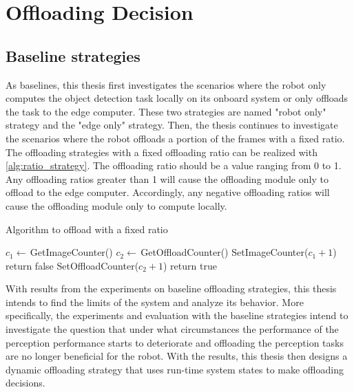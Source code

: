 \section{Offloading Decision}\label{sec:offloading_decision}

\subsection{Baseline strategies}

As baselines, this thesis first investigates the scenarios where the robot only computes the object detection task locally on its onboard system or only offloads the task to the edge computer. These two strategies are named "robot only" strategy and the "edge only" strategy. Then, the thesis continues to investigate the scenarios where the robot offloads a portion of the frames with a fixed ratio. The offloading strategies with a fixed offloading ratio can be realized with \cref{alg:ratio_strategy}. The offloading ratio should be a value ranging from 0 to 1. Any offloading ratios greater than 1 will cause the offloading module only to offload to the edge computer. Accordingly, any negative offloading ratios will cause the offloading module only to compute locally. 

\begin{algorithm}[htp]
\caption{Algorithm to offload with a fixed ratio}\label{alg:ratio_strategy}
\begin{algorithmic}[1]
     
        \State $c_1 \gets \, $GetImageCounter()
        \State $c_2 \gets \, $GetOffloadCounter()
        \State SetImageCounter($c_1 + 1$) 
            \State return false 
        \Else
            \State SetOffloadCounter($c_2 + 1$)
            \State return true 
        \EndIf
    \EndFunction
\end{algorithmic}
\end{algorithm}

With results from the experiments on baseline offloading strategies, this thesis intends to find the limits of the system and analyze its behavior. More specifically, the experiments and evaluation with the baseline strategies intend to investigate the question that under what circumstances the performance of the perception performance starts to deteriorate and offloading the perception tasks are no longer beneficial for the robot. With the results, this thesis then designs a dynamic offloading strategy that uses run-time system states to make offloading decisions. 

